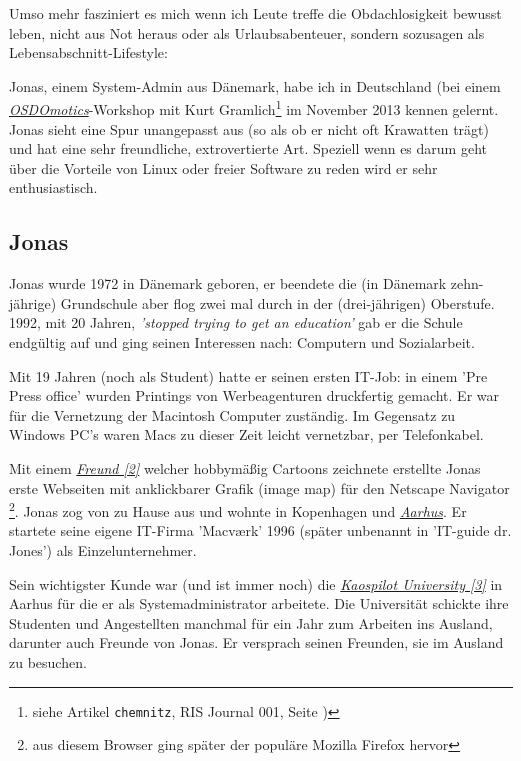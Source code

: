\documentclass[10pt,a4paper,ngerman,twoside]{article} %
\begin{document}
Umso mehr fasziniert es mich wenn ich Leute treffe die Obdachlosigkeit bewusst leben, nicht aus Not heraus oder als Urlaubsabenteuer, sondern sozusagen als Lebensabschnitt-Lifestyle: 

Jonas, einem System-Admin aus Dänemark, habe ich in Deutschland (bei einem \href{http://osdomotics.com}{\textit{OSDOmotics}}-Workshop mit Kurt Gramlich\footnote{siehe Artikel \texttt{chemnitz}, RIS Journal 001, Seite \pageref{chemnitz})} im November 2013 kennen gelernt. Jonas sieht eine Spur unangepasst aus (so als ob er nicht oft Krawatten trägt) und hat eine sehr freundliche, extrovertierte Art. Speziell wenn es darum geht über die Vorteile von Linux oder freier Software zu reden wird er sehr enthusiastisch. 

\subsection*{Jonas}
Jonas wurde 1972 in Dänemark geboren, er beendete die (in Dänemark zehn-jährige) Grundschule aber flog zwei mal durch in der (drei-jährigen) Oberstufe. 1992, mit 20 Jahren,  \textit{'stopped trying to get an education'} gab er die Schule endgültig auf und ging seinen Interessen nach: Computern und Sozialarbeit.

Mit 19 Jahren (noch als Student) hatte er seinen ersten IT-Job: in einem 'Pre Press office' wurden Printings von Werbeagenturen druckfertig gemacht. Er war für die Vernetzung der Macintosh Computer zuständig. Im Gegensatz zu Windows PC's waren Macs zu dieser Zeit leicht vernetzbar, per Telefonkabel.

Mit einem \href{http://binx.com/}{\textit{Freund [2]}} welcher hobbymäßig Cartoons zeichnete erstellte Jonas erste Webseiten mit anklickbarer Grafik (image map) für den Netscape Navigator \footnote{aus diesem Browser ging später der populäre Mozilla Firefox hervor}. Jonas zog von zu Hause aus und wohnte in Kopenhagen und \href{https://en.wikipedia.org/wiki/Aarhus}{\textit{Aarhus}}. Er startete seine eigene IT-Firma 'Macværk' 1996 (später unbenannt in 'IT-guide dr. Jones') als Einzelunternehmer.

Sein wichtigster Kunde war (und ist immer noch) die \href{http://kaospilot.dk/}{\textit{Kaospilot University [3]}} in Aarhus für die er als Systemadministrator arbeitete. Die Universität schickte ihre Studenten und Angestellten manchmal für ein Jahr zum Arbeiten ins Ausland, darunter auch Freunde von Jonas. Er versprach seinen Freunden, sie im Ausland zu besuchen.
\end{document}
